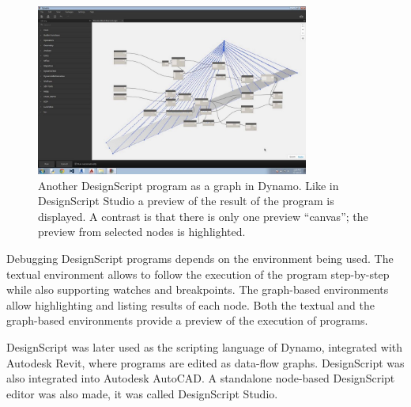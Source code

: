 \documentclass{./llncs2e/llncs}
\begin{document}
	\begin{figure}
		\centering
		\includegraphics[width=0.8\textwidth]{img/ds_dynamo}
		\caption{Another DesignScript program as a graph in Dynamo. Like in DesignScript Studio a preview of the result of the program is displayed. A contrast is that there is only one preview ``canvas''; the preview from selected nodes is highlighted.}
		\label{fig:ds:dynamo}
	\end{figure} 
	
	Debugging DesignScript programs depends on the environment being used. 
	The textual environment allows to follow the execution of the program step-by-step while also supporting watches and breakpoints. 
	The graph-based environments allow highlighting and listing results of each node. 
	Both the textual and the graph-based environments provide a preview of the execution of programs.
	
	
	DesignScript was later used as the scripting language of Dynamo, integrated with Autodesk Revit, where programs are edited as data-flow graphs. 
	DesignScript was also integrated into Autodesk AutoCAD. 
	A standalone node-based DesignScript editor was also made, it was called DesignScript Studio.
	
\end{document}
